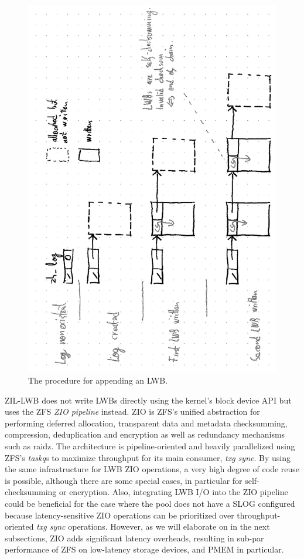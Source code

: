 \documentclass[12pt,a4paper,twoside]{book}
\begin{document}
\begin{figure}[H]
    \centering
    \includegraphics{fig/zil_lwb__physical_structure_append}
    \caption{The procedure for appending an LWB.}
    \label{fig:zil_lwb__physical_structure_append}
\end{figure}

ZIL-LWB does not write LWBs directly using the kernel's block device API but uses the ZFS \textit{ZIO pipeline} instead.
ZIO is ZFS's unified abstraction for performing deferred allocation, transparent data and metadata checksumming, compression, deduplication and encryption as well as redundancy mechanisms such as raidz.
The architecture is pipeline-oriented and heavily parallelized using ZFS's \textit{taskq}s to maximize throughput for its main consumer, \textit{txg sync}.
By using the same infrastructure for LWB ZIO operations, a very high degree of code reuse is possible, although there are some special cases, in particular for self-checksumming or encryption.
Also, integrating LWB I/O into the ZIO pipeline could be beneficial for the case where the pool does not have a SLOG configured because latency-sensitive ZIO operations can be prioritized over throughput-oriented \textit{txg sync} operations.
However, as we will elaborate on in the next subsections, ZIO adds significant latency overheads, resulting in sub-par performance of ZFS on low-latency storage devices, and PMEM in particular.
\end{document}
